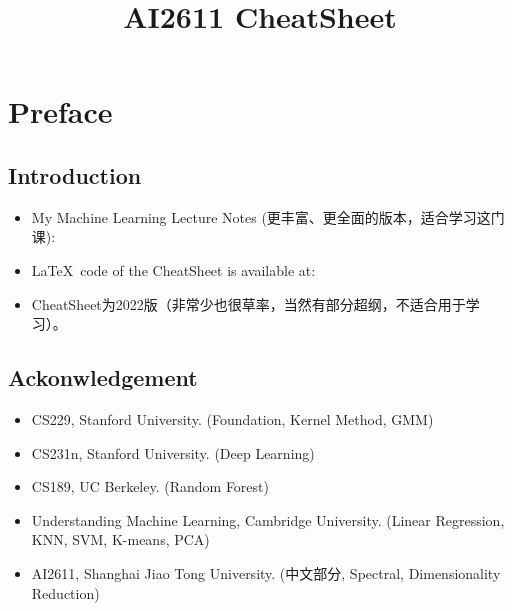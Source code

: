 \documentclass[a4paper,landscape]{article}
\begin{document}
\setlength{\abovedisplayskip}{0.5pt}
\setlength{\belowdisplayskip}{0.5pt}

\newcommand{\ds}{\displaystyle}
\title{AI2611 CheatSheet}
\maketitle
\section*{\centering Preface}
\begin{minipage}[t]{0.5\linewidth}
	\subsection*{\centering \vspace{0.5cm} Introduction}
\begin{itemize}
	\item
	      My Machine Learning Lecture Notes (更丰富、更全面的版本，适合学习这门课):
	\item
	      \LaTeX\, code of the CheatSheet is available at:
	\item
	      CheatSheet为2022版（非常少也很草率，当然有部分超纲，不适合用于学习）。
\end{itemize}
\end{minipage}
\begin{minipage}[t]{0.5\linewidth}
\subsection*{\centering \vspace{0.5cm} Ackonwledgement}
\begin{itemize}
	\item CS229, Stanford University. (Foundation, Kernel Method, GMM)
	\item CS231n, Stanford University. (Deep Learning)
	\item CS189, UC Berkeley. (Random Forest)
	\item Understanding Machine Learning, Cambridge University. (Linear Regression, KNN, SVM, K-means, PCA)
	\item AI2611, Shanghai Jiao Tong University. (中文部分, Spectral, Dimensionality Reduction)
\end{itemize}
\end{minipage}

\clearpage
\end{document}
